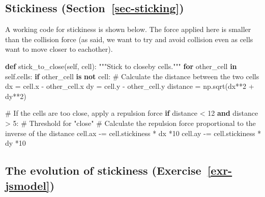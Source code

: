 \documentclass[
  letterpaper,
  DIV=11,
  numbers=noendperiod]{scrreprt}
\newenvironment{Shaded}{\begin{snugshade}}{\end{snugshade}}
\newcommand{\CommentTok}[1]{\textcolor[rgb]{0.37,0.37,0.37}{#1}}
\newcommand{\ControlFlowTok}[1]{\textcolor[rgb]{0.00,0.23,0.31}{\textbf{#1}}}
\newcommand{\DecValTok}[1]{\textcolor[rgb]{0.68,0.00,0.00}{#1}}
\newcommand{\KeywordTok}[1]{\textcolor[rgb]{0.00,0.23,0.31}{\textbf{#1}}}
\newcommand{\NormalTok}[1]{\textcolor[rgb]{0.00,0.23,0.31}{#1}}
\newcommand{\OperatorTok}[1]{\textcolor[rgb]{0.37,0.37,0.37}{#1}}
\newcommand{\VariableTok}[1]{\textcolor[rgb]{0.07,0.07,0.07}{#1}}
\theoremstyle{definition}
\theoremstyle{remark}
\begin{document}
\subsection{\texorpdfstring{Stickiness
(Section~\ref{sec-sticking})}{Stickiness (Section~)}}\label{stickiness-sec-sticking}

A working code for stickiness is shown below. The force applied here is
smaller than the collision force (as said, we want to try and avoid
collision even as cells want to move closer to eachother).

\begin{Shaded}
\begin{Highlighting}[]
\KeywordTok{def}\NormalTok{ stick\_to\_close(}\VariableTok{self}\NormalTok{, cell):}
        \CommentTok{"""Stick to closeby cells."""}
        \ControlFlowTok{for}\NormalTok{ other\_cell }\KeywordTok{in} \VariableTok{self}\NormalTok{.cells:}
            \ControlFlowTok{if}\NormalTok{ other\_cell }\KeywordTok{is} \KeywordTok{not}\NormalTok{ cell:}
                \CommentTok{\# Calculate the distance between the two cells}
\NormalTok{                dx }\OperatorTok{=}\NormalTok{ cell.x }\OperatorTok{{-}}\NormalTok{ other\_cell.x}
\NormalTok{                dy }\OperatorTok{=}\NormalTok{ cell.y }\OperatorTok{{-}}\NormalTok{ other\_cell.y}
\NormalTok{                distance }\OperatorTok{=}\NormalTok{ np.sqrt(dx}\OperatorTok{**}\DecValTok{2} \OperatorTok{+}\NormalTok{ dy}\OperatorTok{**}\DecValTok{2}\NormalTok{)}

                \CommentTok{\# If the cells are too close, apply a repulsion force}
                \ControlFlowTok{if}\NormalTok{ distance }\OperatorTok{\textless{}} \DecValTok{12} \KeywordTok{and}\NormalTok{ distance }\OperatorTok{\textgreater{}} \DecValTok{5}\NormalTok{:  }\CommentTok{\# Threshold for "close"}
                    \CommentTok{\# Calculate the repulsion force proportional to the inverse of the distance}
\NormalTok{                    cell.ax }\OperatorTok{{-}=}\NormalTok{ cell.stickiness }\OperatorTok{*}\NormalTok{ dx }\OperatorTok{*}\DecValTok{10}
\NormalTok{                    cell.ay }\OperatorTok{{-}=}\NormalTok{ cell.stickiness }\OperatorTok{*}\NormalTok{ dy }\OperatorTok{*}\DecValTok{10}
\end{Highlighting}
\end{Shaded}

\subsection{\texorpdfstring{The evolution of stickiness
(Exercise~\ref{exr-jsmodel})}{The evolution of stickiness (Exercise~)}}\label{the-evolution-of-stickiness-exr-jsmodel}
\end{document}
